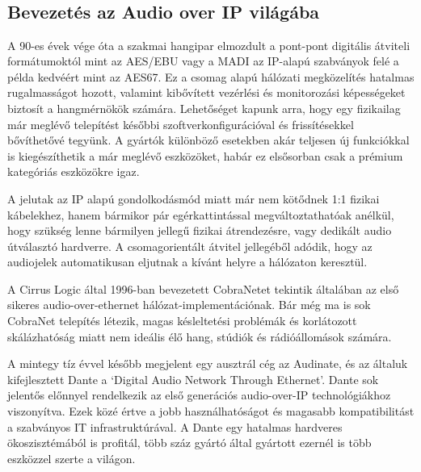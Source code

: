 \chapter{\AudioOverIp~\cite{AHNERT2023}}
\section{Bevezetés az Audio over IP világába}
A 90-es évek vége óta a szakmai hangipar elmozdult a pont-pont digitális
átviteli formátumoktól mint az AES/EBU vagy a MADI az IP-alapú szabványok felé a példa kedvéért mint az AES67. 
Ez a csomag alapú hálózati megközelítés hatalmas rugalmasságot
hozott, valamint kibővített vezérlési és monitorozási képességeket biztosít a
hangmérnökök számára. Lehetőséget kapunk arra, hogy egy fizikailag már meglévő
telepítést későbbi szoftverkonfigurációval és frissítésekkel bővíthetővé tegyünk.
A gyártók különböző esetekben akár teljesen új funkciókkal is kiegészíthetik a már meglévő eszközöket,
habár ez elsősorban csak a prémium kategóriás eszközökre igaz.

A jelutak az IP alapú gondolkodásmód miatt már nem kötődnek 1:1 fizikai kábelekhez, hanem
bármikor pár egérkattintással megváltoztathatóak anélkül, hogy szükség lenne bármilyen
jellegű fizikai átrendezésre, vagy dedikált audio útválasztó hardverre. 
A csomagorientált átvitel jellegéből adódik, hogy az audiojelek automatikusan eljutnak 
a kívánt helyre a hálózaton keresztül.

A Cirrus Logic által 1996-ban bevezetett CobraNetet
tekintik általában az első sikeres audio-over-ethernet hálózat-implementációnak.
Bár még ma is sok CobraNet telepítés létezik, magas késleltetési problémák és korlátozott skálázhatóság
miatt nem ideális élő hang, stúdiók és rádióállomások számára.

A mintegy tíz évvel később megjelent egy ausztrál cég az Audinate, és az általuk kifejlesztett
Dante a `Digital Audio Network Through Ethernet'. Dante sok jelentős
előnnyel rendelkezik az első generációs audio-over-IP technológiákhoz viszonyítva.
Ezek közé értve a jobb használhatóságot és magasabb kompatibilitást a szabványos
IT infrastruktúrával. A Dante egy hatalmas hardveres ökoszisztémából is profitál, 
több száz gyártó által gyártott ezernél is több eszközzel szerte a világon.

